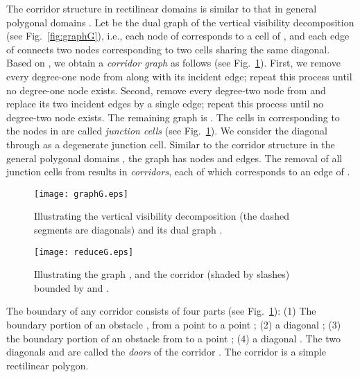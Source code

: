\documentclass[english,runningheads,11pt]{llncs-revised}
\begin{document}
The corridor structure in rectilinear domains is similar to that
in general polygonal domains \cite{ref:KapoorAn97}.
Let  be the dual graph of the vertical visibility
decomposition  (see
Fig.~\ref{fig:graphG}), i.e., each node of
 corresponds to a cell of  ,
and each edge of  connects two
nodes corresponding to two cells sharing the same diagonal.
Based on , we obtain a {\em corridor graph}  as follows (see
Fig.~\ref{fig:reduceG}). First, we
remove every degree-one node from  along with its incident edge;
repeat this process until no degree-one node exists. Second,
remove every degree-two node from 
and replace its two incident edges by a
single edge; repeat this process until no degree-two node exists. The
remaining graph is . The cells in  corresponding to the nodes
in  are called {\em junction cells} (see Fig.~\ref{fig:reduceG}).
We consider the diagonal through  as a degenerate junction cell.
Similar to the corridor structure in the
general polygonal domains \cite{ref:KapoorAn97},
the graph  has  nodes and  edges.
The removal of all junction cells from  results in 
{\em corridors}, each of which corresponds to an edge of .


\begin{figure}[t]
\begin{minipage}[t]{0.49\linewidth}
\begin{center}
\texttt{[image: graphG.eps]}
\caption{\footnotesize Illustrating the vertical visibility
decomposition (the
dashed segments are diagonals) and its dual graph . }
\label{fig:graphG}
\end{center}
\end{minipage}
\hspace{0.02in}
\begin{minipage}[t]{0.49\linewidth}
\begin{center}
\texttt{[image: reduceG.eps]}
\caption{\footnotesize Illustrating the graph ,
and the corridor (shaded by slashes)
bounded by  and .
}
\label{fig:reduceG}
\end{center}
\end{minipage}
\end{figure}


The boundary of any corridor  consists of four parts (see
Fig.~\ref{fig:reduceG}): (1) The boundary portion of an obstacle , from
a point  to a point ; (2) a diagonal ; (3) the
boundary portion of an obstacle  from  to a point ; (4) a
diagonal .  The two diagonals 
and  are called the {\em doors} of the corridor .
The corridor  is a simple rectilinear polygon.
\end{document}

